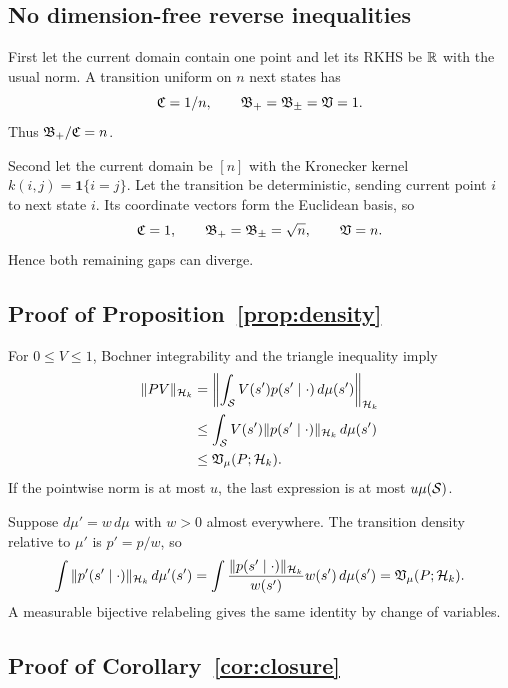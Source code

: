 \subsection{No dimension-free reverse inequalities}

First let the current domain contain one point and let its RKHS be $\mathbb R$ with the
usual norm. A transition uniform on $n$ next states has
\begin{equation}
 \mathfrak C=1/n,
 \qquad \mathfrak B_{+}=\mathfrak B_{\pm}=\mathfrak V=1.
\end{equation}
Thus $\mathfrak B_{+}/\mathfrak C=n$.

Second let the current domain be $[n]$ with the Kronecker kernel
$k(i,j)=\mathbf1\{i=j\}$. Let the transition be deterministic, sending current
point $i$ to next state $i$. Its coordinate vectors form the Euclidean basis, so
\begin{equation}
 \mathfrak C=1,
 \qquad \mathfrak B_{+}=\mathfrak B_{\pm}=\sqrt n,
 \qquad \mathfrak V=n.
\end{equation}
Hence both remaining gaps can diverge.

\subsection{Proof of Proposition~\ref{prop:density}}

For $0\leq V\leq1$, Bochner integrability and the triangle inequality imply
\begin{align}
 \|PV\|_{\mathcal H_k}
 &=\left\|\int_{\mathcal S}V(s')p(s'\mid\cdot)\,d\mu(s')\right\|_{\mathcal H_k}\\
 &\leq\int_{\mathcal S}V(s')\|p(s'\mid\cdot)\|_{\mathcal H_k}\,d\mu(s')\\
 &\leq\mathfrak V_\mu(P;\mathcal H_k).
\end{align}
If the pointwise norm is at most $u$, the last expression is at most
$u\mu(\mathcal S)$.

Suppose $d\mu'=w\,d\mu$ with $w>0$ almost everywhere. The transition density
relative to $\mu'$ is $p'=p/w$, so
\begin{equation}
 \int\|p'(s'\mid\cdot)\|_{\mathcal H_k}\,d\mu'(s')
 =\int\frac{\|p(s'\mid\cdot)\|_{\mathcal H_k}}{w(s')}w(s')\,d\mu(s')
 =\mathfrak V_\mu(P;\mathcal H_k).
\end{equation}
A measurable bijective relabeling gives the same identity by change of variables.

\subsection{Proof of Corollary~\ref{cor:closure}}

